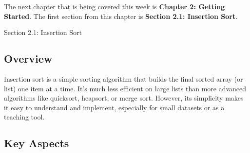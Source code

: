 The next chapter that is being covered this week is \textbf{Chapter 2: Getting Started}. The first section from this chapter is \textbf{Section 2.1: Insertion Sort}.

\begin{notes}{Section 2.1: Insertion Sort}
    \subsection*{Overview}

    Insertion sort is a simple sorting algorithm that builds the final sorted array (or list) one item at a time. It's much less efficient on large lists than more advanced algorithms like quicksort, 
    heapsort, or merge sort. However, its simplicity makes it easy to understand and implement, especially for small datasets or as a teaching tool. \vspace*{1em}

    \subsection*{Key Aspects}


\end{notes}
